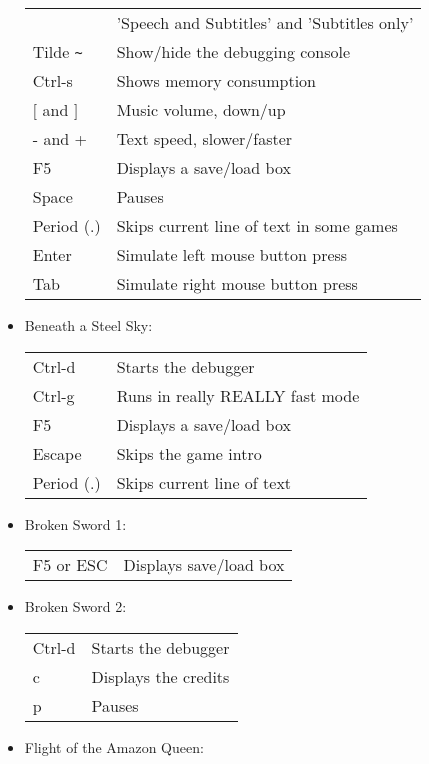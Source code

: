 \begin{itemize}
\begin{tabular}{ll}
                           & 'Speech and Subtitles' and 'Subtitles only'\\
    Tilde \verb#~#         & Show/hide the debugging console\\
    Ctrl-s                 & Shows memory consumption\\
    $[$ and $]$                & Music volume, down/up\\
    - and +                & Text speed, slower/faster\\
    F5                     & Displays a save/load box\\
    Space                  & Pauses\\
    Period (.)             & Skips current line of text in some games\\
    Enter                  & Simulate left mouse button press\\
    Tab                    & Simulate right mouse button press\\
  \end{tabular}
\item Beneath a Steel Sky:\\
  \begin{tabular}{ll}
    Ctrl-d                 & Starts the debugger\\
    Ctrl-g                 & Runs in really REALLY fast mode\\
    F5                     & Displays a save/load box\\
    Escape                 & Skips the game intro\\
    Period (.)             & Skips current line of text\\
  \end{tabular}
\item Broken Sword 1:\\
  \begin{tabular}{ll}
    F5 or ESC              & Displays save/load box\\
  \end{tabular}
\item Broken Sword 2:\\
  \begin{tabular}{ll}
    Ctrl-d                 & Starts the debugger\\
    c                      & Displays the credits\\
    p                      & Pauses\\
  \end{tabular}
\item Flight of the Amazon Queen:

\end{itemize}
